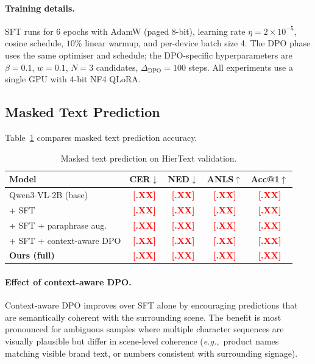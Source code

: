 \documentclass[uplatex,10pt,twocolumn,a4paper]{article}
\newcommand{\TODO}[1]{\textcolor{red}{\textbf{[#1]}}}
\newcommand{\eg}{\textit{e.g.,}\ }
\begin{document}
\paragraph{Training details.}
SFT runs for 6 epochs with AdamW (paged 8-bit), learning rate
$\eta = 2 \times 10^{-5}$, cosine schedule, $10\%$ linear warmup, and
per-device batch size 4.
The DPO phase uses the same optimiser and schedule; the DPO-specific
hyperparameters are $\beta = 0.1$, $w = 0.1$, $N = 3$ candidates,
$\Delta_\mathrm{DPO} = 100$ steps.
All experiments use a single GPU with 4-bit NF4 QLoRA.

\subsection{Masked Text Prediction}

Table~\ref{tab:ocr} compares masked text prediction accuracy.

\begin{table}[t]
  \centering
  \caption{Masked text prediction on HierText validation.}
  \label{tab:ocr}
  \small
  \begin{tabular}{lcccc}
    \toprule
    Model & CER$\downarrow$ & NED$\downarrow$ & ANLS$\uparrow$ & Acc@1$\uparrow$ \\
    \midrule
    Qwen3-VL-2B (base)         & \TODO{.XX} & \TODO{.XX} & \TODO{.XX} & \TODO{.XX} \\
    + SFT                      & \TODO{.XX} & \TODO{.XX} & \TODO{.XX} & \TODO{.XX} \\
    + SFT + paraphrase aug.    & \TODO{.XX} & \TODO{.XX} & \TODO{.XX} & \TODO{.XX} \\
    + SFT + context-aware DPO  & \TODO{.XX} & \TODO{.XX} & \TODO{.XX} & \TODO{.XX} \\
    \textbf{Ours (full)}       & \TODO{.XX} & \TODO{.XX} & \TODO{.XX} & \TODO{.XX} \\
    \bottomrule
  \end{tabular}
\end{table}

\paragraph{Effect of context-aware DPO.}
Context-aware DPO improves over SFT alone by encouraging predictions
that are semantically coherent with the surrounding scene.
The benefit is most pronounced for ambiguous samples where multiple
character sequences are visually plausible but differ in scene-level
coherence (\eg product names matching visible brand text, or numbers
consistent with surrounding signage).
\end{document}
